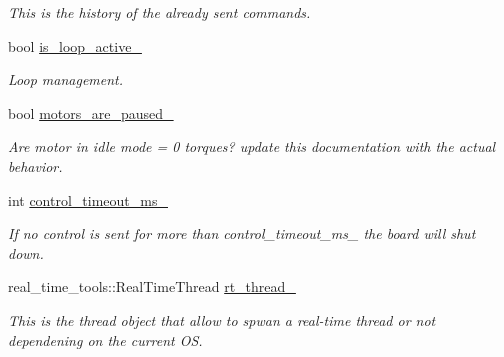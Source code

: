 \begin{DoxyCompactItemize}
\begin{DoxyCompactList}\small\item\em This is the history of the already sent commands. \end{DoxyCompactList}\item 
bool \hyperlink{classblmc__drivers_1_1CanBusMotorBoard_ae25808cc09839c2574d134a36b5b4d5d}{is\+\_\+loop\+\_\+active\+\_\+}
\begin{DoxyCompactList}\small\item\em Loop management. \end{DoxyCompactList}\item 
bool \hyperlink{classblmc__drivers_1_1CanBusMotorBoard_abdca3f76908ca197c4f12af814313a56}{motors\+\_\+are\+\_\+paused\+\_\+}\hypertarget{classblmc__drivers_1_1CanBusMotorBoard_abdca3f76908ca197c4f12af814313a56}{}\label{classblmc__drivers_1_1CanBusMotorBoard_abdca3f76908ca197c4f12af814313a56}

\begin{DoxyCompactList}\small\item\em Are motor in idle mode = 0 torques?  update this documentation with the actual behavior. \end{DoxyCompactList}\item 
int \hyperlink{classblmc__drivers_1_1CanBusMotorBoard_a4f9605b0a147ecd1dde41a0fb7b45d47}{control\+\_\+timeout\+\_\+ms\+\_\+}\hypertarget{classblmc__drivers_1_1CanBusMotorBoard_a4f9605b0a147ecd1dde41a0fb7b45d47}{}\label{classblmc__drivers_1_1CanBusMotorBoard_a4f9605b0a147ecd1dde41a0fb7b45d47}

\begin{DoxyCompactList}\small\item\em If no control is sent for more than control\+\_\+timeout\+\_\+ms\+\_\+ the board will shut down. \end{DoxyCompactList}\item 
real\+\_\+time\+\_\+tools\+::\+Real\+Time\+Thread \hyperlink{classblmc__drivers_1_1CanBusMotorBoard_a040b0b2f6c2691a54d82404f7a1badd6}{rt\+\_\+thread\+\_\+}\hypertarget{classblmc__drivers_1_1CanBusMotorBoard_a040b0b2f6c2691a54d82404f7a1badd6}{}\label{classblmc__drivers_1_1CanBusMotorBoard_a040b0b2f6c2691a54d82404f7a1badd6}

\begin{DoxyCompactList}\small\item\em This is the thread object that allow to spwan a real-\/time thread or not dependening on the current OS. \end{DoxyCompactList}\end{DoxyCompactItemize}
